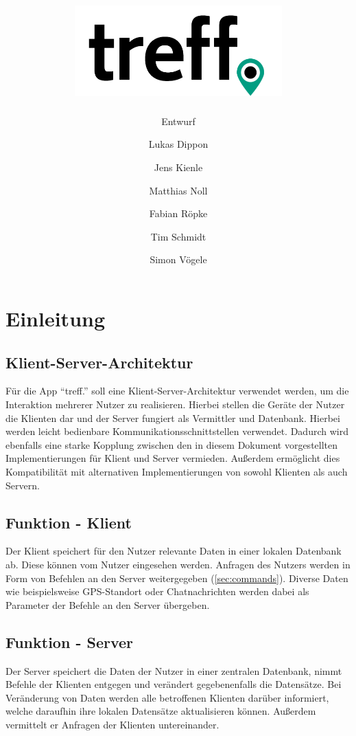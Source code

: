 \documentclass[parskip=full,11pt]{scrartcl}
\title{\includegraphics[width = 80mm]{images/logo_crop.png}}
\subtitle{\huge Entwurf}
\author{Lukas Dippon
        \and Jens Kienle
        \and Matthias Noll
        \and Fabian Röpke
        \and Tim Schmidt
        \and Simon Vögele}
\begin{document}
\maketitle
\thispagestyle{empty} %

\pagebreak
\tableofcontents

\pagebreak
\section{Einleitung}

\subsection{Klient-Server-Architektur}
Für die App \enquote{treff.} soll eine Klient-Server-Architektur verwendet
werden, um die Interaktion mehrerer Nutzer zu realisieren.
Hierbei stellen die Geräte der Nutzer die Klienten dar und der Server
fungiert als Vermittler und Datenbank.
Hierbei werden leicht bedienbare Kommunikationsschnittstellen verwendet.
Dadurch wird ebenfalls eine starke Kopplung zwischen den in diesem Dokument
vorgestellten Implementierungen für Klient und Server vermieden.
Außerdem ermöglicht dies Kompatibilität mit alternativen Implementierungen
von sowohl Klienten als auch Servern.

\subsection{Funktion - Klient}
Der Klient speichert für den Nutzer relevante Daten in einer lokalen Datenbank
ab.
Diese können vom Nutzer eingesehen werden.
Anfragen des Nutzers werden in Form von Befehlen an den Server weitergegeben
(\ref{sec:commands}).
Diverse Daten wie beispielsweise GPS-Standort oder Chatnachrichten werden
dabei als Parameter der Befehle an den Server übergeben.

\subsection{Funktion - Server}
Der Server speichert die Daten der Nutzer in einer zentralen Datenbank, nimmt
Befehle der Klienten entgegen und verändert gegebenenfalls die Datensätze.
Bei Veränderung von Daten werden alle betroffenen Klienten darüber informiert,
welche daraufhin ihre lokalen Datensätze aktualisieren können. Außerdem
vermittelt er Anfragen der Klienten untereinander.

\pagebreak
\end{document}
